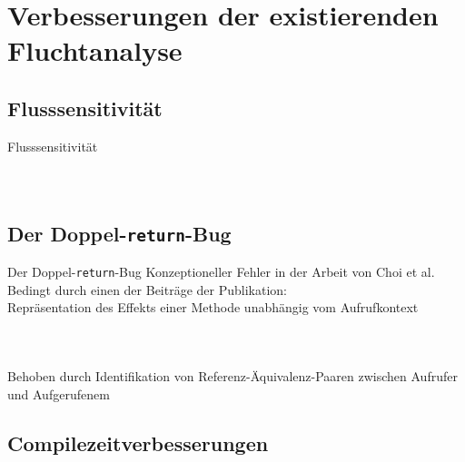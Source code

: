 \documentclass[usenames,dvipsnames,smaller]{beamer}
\begin{document}
	\section{Verbesserungen der existierenden Fluchtanalyse}
		\subsection{Flusssensitivität}
			\begin{frame}{Flusssensitivität}
				\begin{columns}
					\begin{column}{.5\textwidth}
						\inputminted[fontsize=\footnotesize,linenos,tabsize=2,xleftmargin=1.5em]{java}{FlowSensitivity.java}
					\end{column}
					\begin{column}{.5\textwidth}
						
					\end{column}
				\end{columns}
			\end{frame}

		\subsection{Der Doppel-\texttt{return}-Bug}
			\begin{frame}{Der Doppel-\texttt{return}-Bug}
				\bi
					\ii Konzeptioneller Fehler in der Arbeit von Choi et al.
					\ii Bedingt durch einen der Beiträge der Publikation:\\
						Repräsentation des Effekts einer Methode unabhängig vom Aufrufkontext
				\ei
				\begin{columns}
					\begin{column}{.6\textwidth}
						\inputminted[fontsize=\footnotesize,linenos,tabsize=2,xleftmargin=1.5em]{java}{Choose.java}
					\end{column}
					\begin{column}{.4\textwidth}
						\centering
						
						\vspace*{.2cm}
						\hline
						\vspace*{.2cm}
						
					\end{column}
				\end{columns}
				\bi
					 Behoben durch Identifikation von Referenz-Äquivalenz-Paaren zwischen Aufrufer und Aufgerufenem
				\ei
			\end{frame}

		\subsection{Compilezeitverbesserungen}
\end{document}
